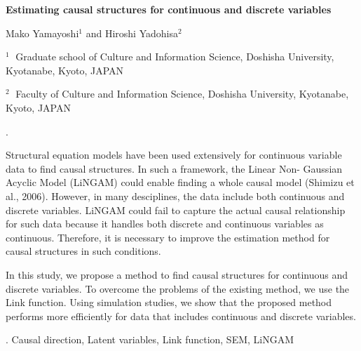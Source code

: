\documentclass[12pt]{article}
\begin{document}
\begin{flushleft}


 {\LARGE\bf Estimating causal structures for continuous and discrete variables
}


\vspace{1.0cm}

Mako Yamayoshi$^1$ and Hiroshi Yadohisa$^2$

\begin{description}

\item $^1 \;$ Graduate school of Culture and Information Science, Doshisha University, Kyotanabe, Kyoto, JAPAN
\item $^2 \;$ Faculty of Culture and Information Science, Doshisha University, Kyotanabe, Kyoto, JAPAN

\end{description}

\end{flushleft}


\vspace{0.75cm}

.

Structural equation models have been used extensively for continuous variable data to find causal structures. In such a framework, the Linear Non- Gaussian Acyclic Model (LiNGAM) could enable finding a whole causal model (Shimizu et al., 2006). However, in many desciplines, the data include both continuous and discrete variables. LiNGAM could fail to capture the actual causal relationship for such data because it handles both discrete and continuous variables as continuous. Therefore, it is necessary to improve the estimation method for causal structures in such conditions. 

 In this study, we propose a method to find causal structures for continuous and discrete variables. To overcome the problems of the existing method, we use the Link function. Using simulation studies, we show that the proposed method performs more efficiently for data that includes continuous and discrete variables. 


  

\vskip 2mm
. Causal direction, Latent variables, Link function, SEM, LiNGAM
\end{document}
